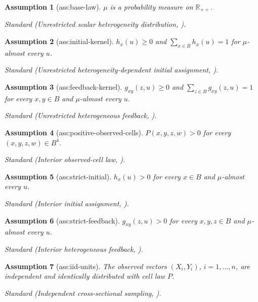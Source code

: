 \documentclass{article}
\newtheorem{assumption}{Assumption}
\begin{document}
\begin{assumption}[ass:base-law]\label{ass:base-law}
\(\mu\) is a probability measure on \(\mathbb R_{++}\).
\par\smallskip\noindent\emph{Standard} (Unrestricted scalar heterogeneity distribution, \cite{bonhommeDanoGraham2023}).
\end{assumption}

\begin{assumption}[ass:initial-kernel]\label{ass:initial-kernel}
\(h_x(u)\ge0\) and \(\sum_{x\in B}h_x(u)=1\) for \(\mu\)-almost every \(u\).
\par\smallskip\noindent\emph{Standard} (Unrestricted heterogeneity-dependent initial assignment, \cite{bonhommeDanoGraham2023}).
\end{assumption}

\begin{assumption}[ass:feedback-kernel]\label{ass:feedback-kernel}
\(g_{xy}(z,u)\ge0\) and \(\sum_{z\in B}g_{xy}(z,u)=1\) for every \(x,y\in B\) and \(\mu\)-almost every \(u\).
\par\smallskip\noindent\emph{Standard} (Unrestricted heterogeneous feedback, \cite{bonhommeDanoGraham2023}).
\end{assumption}

\begin{assumption}[ass:positive-observed-cells]\label{ass:positive-observed-cells}
\(P(x,y,z,w)>0\) for every \((x,y,z,w)\in B^4\).
\par\smallskip\noindent\emph{Standard} (Interior observed-cell law, \cite{bonhommeDanoGraham2023}).
\end{assumption}

\begin{assumption}[ass:strict-initial]\label{ass:strict-initial}
\(h_x(u)>0\) for every \(x\in B\) and \(\mu\)-almost every \(u\).
\par\smallskip\noindent\emph{Standard} (Interior initial assignment, \cite{bonhommeDanoGraham2023}).
\end{assumption}

\begin{assumption}[ass:strict-feedback]\label{ass:strict-feedback}
\(g_{xy}(z,u)>0\) for every \(x,y,z\in B\) and \(\mu\)-almost every \(u\).
\par\smallskip\noindent\emph{Standard} (Interior heterogeneous feedback, \cite{bonhommeDanoGraham2023}).
\end{assumption}

\begin{assumption}[ass:iid-units]\label{ass:iid-units}
The observed vectors \((X_i,Y_i)\), \(i=1,\ldots,n\), are independent and identically distributed with cell law \(P\).
\par\smallskip\noindent\emph{Standard} (Independent cross-sectional sampling, \cite{chernozhukovHongTamer2007}).
\end{assumption}
\end{document}

